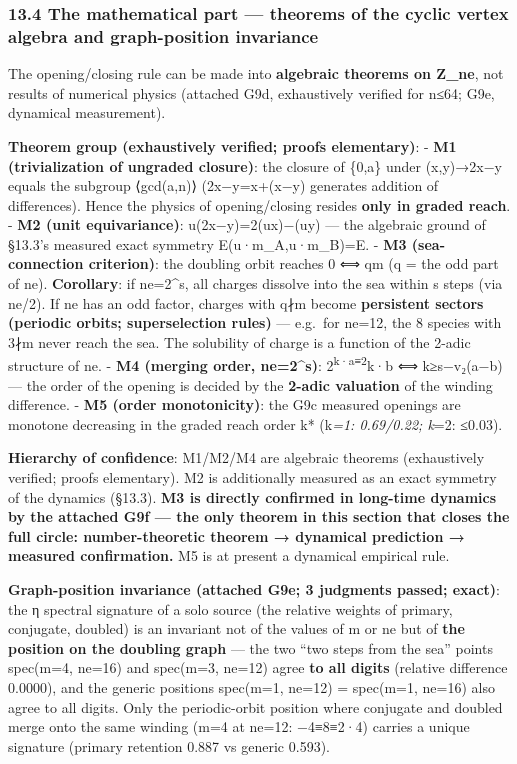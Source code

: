 \documentclass[
]{article}
\begin{document}
\subsubsection{13.4 The mathematical part --- theorems of the cyclic
vertex algebra and graph-position
invariance}\label{the-mathematical-part-theorems-of-the-cyclic-vertex-algebra-and-graph-position-invariance}

The opening/closing rule can be made into \textbf{algebraic theorems on
Z\_ne}, not results of numerical physics (attached G9d, exhaustively
verified for n≤64; G9e, dynamical measurement).

\textbf{Theorem group (exhaustively verified; proofs elementary)}: -
\textbf{M1 (trivialization of ungraded closure)}: the closure of \{0,a\}
under (x,y)→2x−y equals the subgroup ⟨gcd(a,n)⟩ (2x−y=x+(x−y) generates
addition of differences). Hence the physics of opening/closing resides
\textbf{only in graded reach}. - \textbf{M2 (unit equivariance)}:
u(2x−y)=2(ux)−(uy) --- the algebraic ground of §13.3's measured exact
symmetry E(u·m\_A,u·m\_B)=E. - \textbf{M3 (sea-connection criterion)}:
the doubling orbit reaches 0 ⟺ q\textbar m (q = the odd part of ne).
\textbf{Corollary}: if ne=2\^{}s, all charges dissolve into the sea
within s steps (via ne/2). If ne has an odd factor, charges with q∤m
become \textbf{persistent sectors (periodic orbits; superselection
rules)} --- e.g.~for ne=12, the 8 species with 3∤m never reach the sea.
The solubility of charge is a function of the 2-adic structure of ne. -
\textbf{M4 (merging order, ne=2\^{}s)}: 2\textsuperscript{k·a≡2}k·b ⟺
k≥s−v₂(a−b) --- the order of the opening is decided by the
\textbf{2-adic valuation} of the winding difference. - \textbf{M5 (order
monotonicity)}: the G9c measured openings are monotone decreasing in the
graded reach order k* (k\emph{=1: 0.69/0.22; k}=2: ≤0.03).

\textbf{Hierarchy of confidence}: M1/M2/M4 are algebraic theorems
(exhaustively verified; proofs elementary). M2 is additionally measured
as an exact symmetry of the dynamics (§13.3). \textbf{M3 is directly
confirmed in long-time dynamics by the attached G9f --- the only theorem
in this section that closes the full circle: number-theoretic theorem →
dynamical prediction → measured confirmation.} M5 is at present a
dynamical empirical rule.

\textbf{Graph-position invariance (attached G9e; 3 judgments passed;
exact)}: the η spectral signature of a solo source (the relative weights
of primary, conjugate, doubled) is an invariant not of the values of m
or ne but of \textbf{the position on the doubling graph} --- the two
``two steps from the sea'' points spec(m=4, ne=16) and spec(m=3, ne=12)
agree \textbf{to all digits} (relative difference 0.0000), and the
generic positions spec(m=1, ne=12) = spec(m=1, ne=16) also agree to all
digits. Only the periodic-orbit position where conjugate and doubled
merge onto the same winding (m=4 at ne=12: −4≡8≡2·4) carries a unique
signature (primary retention 0.887 vs generic 0.593).
\end{document}
